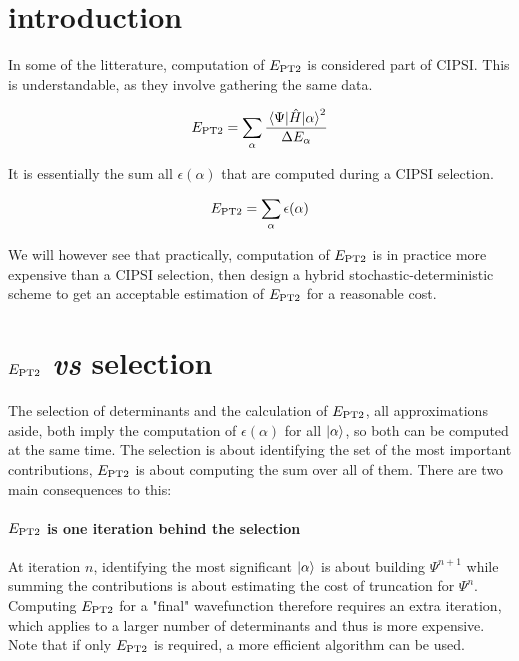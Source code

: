 \documentclass[./thesis.tex]{subfiles}
\begin{document}
\label{chap:PT2}

\section{introduction}


In some of the litterature, computation of $E_\text{PT2}$ is considered part of CIPSI. This is understandable, as they involve gathering the same data.

\begin{equation}
E_\text{PT2} = \sum_\alpha \frac{\mel{\Psi}{\hat{H}}{\alpha}^2}{\Delta E_\alpha}
\end{equation}

It is essentially the sum all $\epsilon(\alpha)$ that are computed during a CIPSI selection.

\begin{equation}
E_\text{PT2} = \sum_\alpha \epsilon(\alpha)
\end{equation}

We will however see that practically, computation of $E_\text{PT2}$ is in practice more expensive than a CIPSI selection, then design a hybrid stochastic-deterministic scheme to get an acceptable estimation of $E_\text{PT2}$ for a reasonable cost. 

\section{$E_\text{PT2}$ \textit{vs} selection}

The selection of determinants and the calculation of $E_\text{PT2}$, all approximations aside, both imply the computation of $\epsilon(\alpha)$ for all $\ket \alpha$, so both can be computed at the same time. The selection is about identifying the set of the most important contributions, $E_\text{PT2}$ is about computing the sum over all of them. There are two main consequences to this:
\paragraph{$E_\text{PT2}$ is one iteration behind the selection}
At iteration $n$, identifying the most significant $\ket \alpha$ is about building $\Psi^{n+1}$ while summing the contributions is about estimating the cost of truncation for $\Psi^{n}$. Computing $E_\text{PT2}$ for a "final" wavefunction therefore requires an extra iteration, which applies to a larger number of determinants and thus is more expensive. Note that if only $E_\text{PT2}$ is required, a more efficient algorithm can be used.\cite{Cimiraglia_1996}
\end{document}
